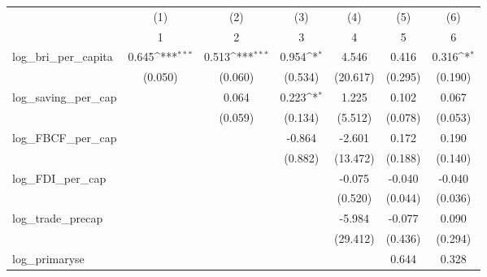 {
\def\sym#1{\ifmmode^{#1}\else\(^{#1}\)\fi}
\begin{tabular}{l*{6}{c}}
\toprule
            &\multicolumn{1}{c}{(1)}&\multicolumn{1}{c}{(2)}&\multicolumn{1}{c}{(3)}&\multicolumn{1}{c}{(4)}&\multicolumn{1}{c}{(5)}&\multicolumn{1}{c}{(6)}\\
            &\multicolumn{1}{c}{1}&\multicolumn{1}{c}{2}&\multicolumn{1}{c}{3}&\multicolumn{1}{c}{4}&\multicolumn{1}{c}{5}&\multicolumn{1}{c}{6}\\
\midrule
log\_bri\_per\_capita&       0.645\sym{***}&       0.513\sym{***}&       0.954\sym{*}  &       4.546         &       0.416         &       0.316\sym{*}  \\
            &     (0.050)         &     (0.060)         &     (0.534)         &    (20.617)         &     (0.295)         &     (0.190)         \\
\addlinespace
log\_saving\_per\_cap&                     &       0.064         &       0.223\sym{*}  &       1.225         &       0.102         &       0.067         \\
            &                     &     (0.059)         &     (0.134)         &     (5.512)         &     (0.078)         &     (0.053)         \\
\addlinespace
log\_FBCF\_per\_cap&                     &                     &      -0.864         &      -2.601         &       0.172         &       0.190         \\
            &                     &                     &     (0.882)         &    (13.472)         &     (0.188)         &     (0.140)         \\
\addlinespace
log\_FDI\_per\_cap&                     &                     &                     &      -0.075         &      -0.040         &      -0.040         \\
            &                     &                     &                     &     (0.520)         &     (0.044)         &     (0.036)         \\
\addlinespace
log\_trade\_precap&                     &                     &                     &      -5.984         &      -0.077         &       0.090         \\
            &                     &                     &                     &    (29.412)         &     (0.436)         &     (0.294)         \\
\addlinespace
log\_primaryse&                     &                     &                     &                     &       0.644         &       0.328         \\

\end{tabular}}
